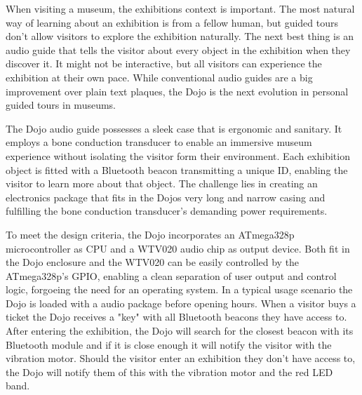 %

%
%
%
%

When visiting a museum, the exhibitions context is important.
The most natural way of learning about an exhibition is from a fellow human, 
	but guided tours don't allow visitors to explore the exhibition naturally.
The next best thing is an audio guide that tells the visitor about every object in the exhibition when they discover it.
It might not be interactive, but all visitors can experience the exhibition at their own pace.
While conventional audio guides are a big improvement over plain text plaques,
	the Dojo is the next evolution in personal guided tours in museums.

The Dojo audio guide possesses a sleek case that is ergonomic and sanitary.
It employs a bone conduction transducer to enable an immersive museum experience 
	without isolating the visitor form their environment.
Each exhibition object is fitted with a Bluetooth beacon transmitting a unique ID, 
	enabling the visitor to learn more about that object.
The challenge lies in creating an electronics package that fits in the Dojos very long and narrow casing
	and fulfilling the bone conduction transducer's demanding power requirements.

To meet the design criteria, the Dojo incorporates an ATmega328p microcontroller as CPU
	and a WTV020 audio chip as output device.
Both fit in the Dojo enclosure and the WTV020 can be easily controlled by the ATmega328p's GPIO, 
	enabling a clean separation of user output and control logic, forgoeing the need for an operating system.
In a typical usage scenario the Dojo is loaded with a audio package before opening hours.
When a visitor buys a ticket the Dojo receives a "key" with all Bluetooth beacons they have access to.
After entering the exhibition, the Dojo will search for the closest beacon with its Bluetooth module
	and if it is close enough it will notify the visitor with the vibration motor.
Should the visitor enter an exhibition they don't have access to, 
	the Dojo will notify them of this with the vibration motor and the red LED band.

